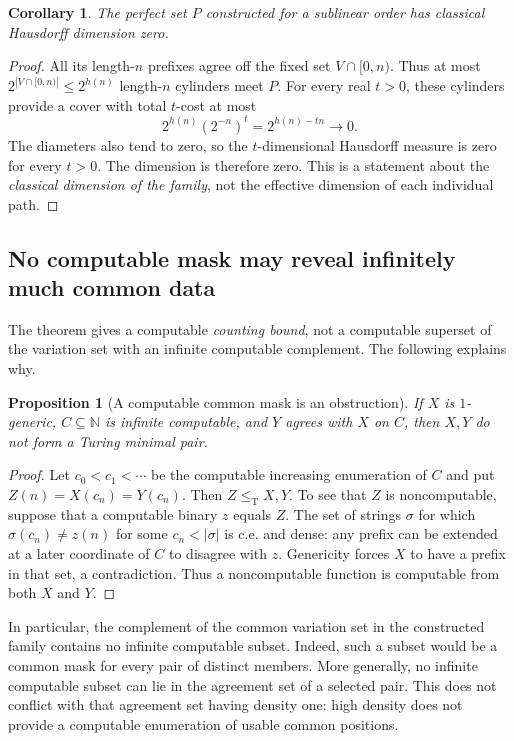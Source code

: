 \documentclass[11pt,a4paper]{article}
\newcommand{\N}{\mathbb N}
\newcommand{\leT}{\leq_{\mathrm T}}
\newtheorem{proposition}[theorem]{Proposition}
\newtheorem{corollary}[theorem]{Corollary}
\theoremstyle{definition}\newtheorem{definition}[theorem]{Definition}
\theoremstyle{remark}\newtheorem{remark}[theorem]{Remark}
\begin{document}
\begin{corollary}\label{cor:dimension}
The perfect set $P$ constructed for a sublinear order has classical Hausdorff
dimension zero.
\end{corollary}
\begin{proof}
All its length-$n$ prefixes agree off the fixed set $V\cap[0,n)$.
Thus at most $2^{|V\cap[0,n)|}\le2^{h(n)}$ length-$n$ cylinders meet $P$.
For every real $t>0$, these cylinders provide a cover with total $t$-cost at
most
\[
                         2^{h(n)}(2^{-n})^t=2^{h(n)-tn}\longrightarrow0.
\]
The diameters also tend to zero, so the $t$-dimensional Hausdorff measure is
zero for every $t>0$. The dimension is therefore zero. This is a statement
about the \emph{classical dimension of the family}, not the effective
dimension of each individual path.
\end{proof}

\subsection{No computable mask may reveal infinitely much common data}
The theorem gives a computable \emph{counting bound}, not a computable
superset of the variation set with an infinite computable complement. The
following explains why.

\begin{proposition}[A computable common mask is an obstruction]\label{prop:mask}
If $X$ is $1$-generic, $C\subseteq\N$ is infinite computable, and $Y$ agrees
with $X$ on $C$, then $X,Y$ do not form a Turing minimal pair.
\end{proposition}
\begin{proof}
Let $c_0<c_1<\cdots$ be the computable increasing enumeration of $C$ and put
$Z(n)=X(c_n)=Y(c_n)$. Then $Z\leT X,Y$.
To see that $Z$ is noncomputable, suppose that a computable binary $z$
equals $Z$. The set of strings $\sigma$ for which
$\sigma(c_n)\ne z(n)$ for some $c_n<|\sigma|$ is c.e. and dense: any prefix
can be extended at a later coordinate of $C$ to disagree with $z$.
Genericity forces $X$ to have a prefix in that set, a contradiction.
Thus a noncomputable function is computable from both $X$ and $Y$.
\end{proof}

In particular, the complement of the common variation set in the constructed
family contains no infinite computable subset. Indeed, such a subset would
be a common mask for every pair of distinct members. More generally, no
infinite computable subset can lie in the agreement set of a selected pair.
This does not conflict with that agreement set having density one: high
density does not provide a computable enumeration of usable common positions.
\end{document}
